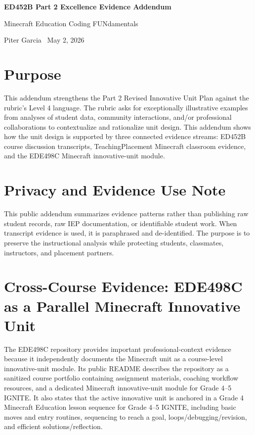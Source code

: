 \documentclass[12pt]{article}
\begin{document}
\begin{center}
{\Large\bfseries\color{navyBlue} ED452B Part 2 Excellence Evidence Addendum}\par
{\large Minecraft Education Coding FUNdamentals}\par
{\normalsize Piter Garcia \textperiodcentered\ May 2, 2026}\par
\end{center}

\section*{Purpose}

This addendum strengthens the Part 2 Revised Innovative Unit Plan against the rubric's Level 4 language. The rubric asks for exceptionally illustrative examples from analyses of student data, community interactions, and/or professional collaborations to contextualize and rationalize unit design. This addendum shows how the unit design is supported by three connected evidence streams: ED452B course discussion transcripts, TeachingPlacement Minecraft classroom evidence, and the EDE498C Minecraft innovative-unit module.

\section*{Privacy and Evidence Use Note}

This public addendum summarizes evidence patterns rather than publishing raw student records, raw IEP documentation, or identifiable student work. When transcript evidence is used, it is paraphrased and de-identified. The purpose is to preserve the instructional analysis while protecting students, classmates, instructors, and placement partners.

\section{Cross-Course Evidence: EDE498C as a Parallel Minecraft Innovative Unit}

The EDE498C repository provides important professional-context evidence because it independently documents the Minecraft unit as a course-level innovative-unit module. Its public README describes the repository as a sanitized course portfolio containing assignment materials, coaching workflow resources, and a dedicated Minecraft innovative-unit module for Grade 4--5 IGNITE. It also states that the active innovative unit is anchored in a Grade 4 Minecraft Education lesson sequence for Grade 4--5 IGNITE, including basic moves and entry routines, sequencing to reach a goal, loops/debugging/revision, and efficient solutions/reflection.
\end{document}

